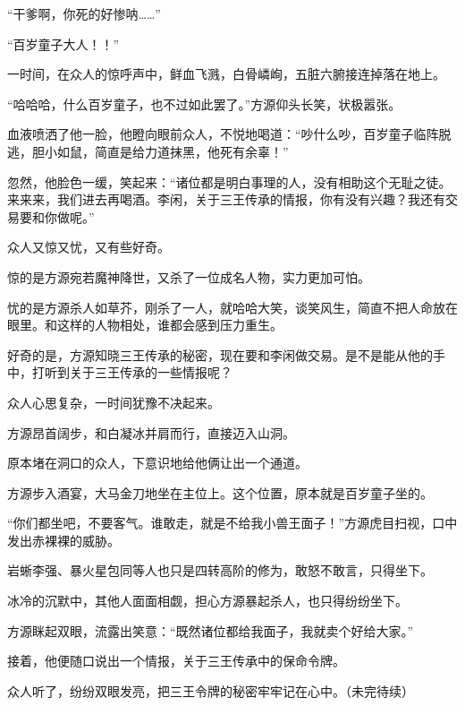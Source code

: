 \begin{this_body}
“干爹啊，你死的好惨呐……”

“百岁童子大人！！”

一时间，在众人的惊呼声中，鲜血飞溅，白骨嶙峋，五脏六腑接连掉落在地上。

“哈哈哈，什么百岁童子，也不过如此罢了。”方源仰头长笑，状极嚣张。

血液喷洒了他一脸，他瞪向眼前众人，不悦地喝道：“吵什么吵，百岁童子临阵脱逃，胆小如鼠，简直是给力道抹黑，他死有余辜！”

忽然，他脸色一缓，笑起来：“诸位都是明白事理的人，没有相助这个无耻之徒。来来来，我们进去再喝酒。李闲，关于三王传承的情报，你有没有兴趣？我还有交易要和你做呢。”

众人又惊又忧，又有些好奇。

惊的是方源宛若魔神降世，又杀了一位成名人物，实力更加可怕。

忧的是方源杀人如草芥，刚杀了一人，就哈哈大笑，谈笑风生，简直不把人命放在眼里。和这样的人物相处，谁都会感到压力重生。

好奇的是，方源知晓三王传承的秘密，现在要和李闲做交易。是不是能从他的手中，打听到关于三王传承的一些情报呢？

众人心思复杂，一时间犹豫不决起来。

方源昂首阔步，和白凝冰并肩而行，直接迈入山洞。

原本堵在洞口的众人，下意识地给他俩让出一个通道。

方源步入酒宴，大马金刀地坐在主位上。这个位置，原本就是百岁童子坐的。

“你们都坐吧，不要客气。谁敢走，就是不给我小兽王面子！”方源虎目扫视，口中发出赤裸裸的威胁。

岩蜥李强、暴火星包同等人也只是四转高阶的修为，敢怒不敢言，只得坐下。

冰冷的沉默中，其他人面面相觑，担心方源暴起杀人，也只得纷纷坐下。

方源眯起双眼，流露出笑意：“既然诸位都给我面子，我就卖个好给大家。”

接着，他便随口说出一个情报，关于三王传承中的保命令牌。

众人听了，纷纷双眼发亮，把三王令牌的秘密牢牢记在心中。（未完待续）

\end{this_body}

